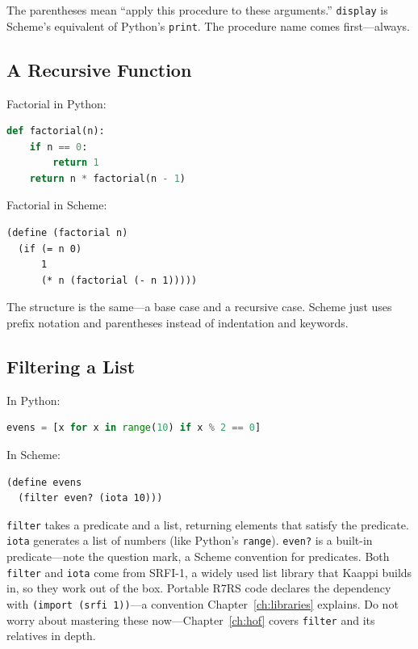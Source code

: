 The parentheses mean ``apply this procedure to these arguments.'' \texttt{display} is Scheme's equivalent of Python's \texttt{print}. The procedure name comes first---always.

\subsection{A Recursive Function}

Factorial in Python:

\begin{lstlisting}[language=Python, style=scheme, keywordstyle=\bfseries]
def factorial(n):
    if n == 0:
        return 1
    return n * factorial(n - 1)
\end{lstlisting}

Factorial in Scheme:

\begin{lstlisting}
(define (factorial n)
  (if (= n 0)
      1
      (* n (factorial (- n 1)))))
\end{lstlisting}

The structure is the same---a base case and a recursive case. Scheme just uses prefix notation and parentheses instead of indentation and keywords.

\subsection{Filtering a List}

In Python:

\begin{lstlisting}[language=Python, style=scheme, keywordstyle=\bfseries]
evens = [x for x in range(10) if x % 2 == 0]
\end{lstlisting}

In Scheme:

\begin{lstlisting}
(define evens
  (filter even? (iota 10)))
\end{lstlisting}

\texttt{filter} takes a predicate and a list, returning elements that satisfy the predicate. \texttt{iota} generates a list of numbers (like Python's \texttt{range}). \texttt{even?} is a built-in predicate---note the question mark, a Scheme convention for predicates. Both \texttt{filter} and \texttt{iota} come from SRFI-1, a widely used list library that Kaappi builds in, so they work out of the box. Portable R7RS code declares the dependency with \texttt{(import (srfi 1))}---a convention Chapter~\ref{ch:libraries} explains. Do not worry about mastering these now---Chapter~\ref{ch:hof} covers \texttt{filter} and its relatives in depth.

